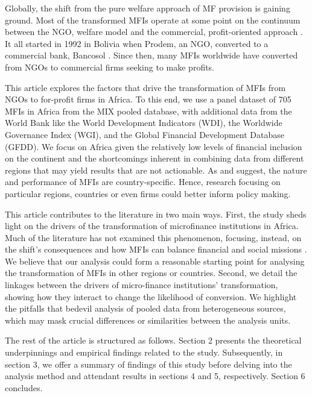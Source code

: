 \documentclass[a4paper,nobind]{templates/ociamthesis}
\begin{document}
Globally, the shift from the pure welfare approach of MF provision is gaining ground. Most of the transformed MFIs operate at some point on the continuum between the NGO, welfare model and the commercial, profit-oriented approach \autocite{armendariz2013subsidy,d2013unsubsidized,hishigsuren2006transformation}. It all started in 1992 in Bolivia when Prodem, an NGO, converted to a commercial bank, Bancosol \autocite{fernando2004micro,creedy2018types}. Since then, many MFIs worldwide have converted from NGOs to commercial firms seeking to make profits.

This article explores the factors that drive the transformation of MFIs from NGOs to for-profit firms in Africa. To this end, we use a panel dataset of 705 MFIs in Africa from the MIX pooled database, with additional data from the World Bank like the World Development Indicators (WDI), the Worldwide Governance Index (WGI), and the Global Financial Development Database (GFDD). We focus on Africa given the relatively low levels of financial inclusion on the continent \autocite{demirguc2018global}and the shortcomings inherent in combining data from different regions that may yield results that are not actionable. As \textcite{d2017ngos} and \textcite{wang2015ownership} suggest, the nature and performance of MFIs are country-specific. Hence, research focusing on particular regions, countries or even firms could better inform policy making.

This article contributes to the literature in two main ways. First, the study sheds light on the drivers of the transformation of microfinance institutions in Africa. Much of the literature has not examined this phenomenon, focusing, instead, on the shift's consequences and how MFIs can balance financial and social missions \autocite{d2013unsubsidized,forkusam2014does,mia2017mission}. We believe that our analysis could form a reasonable starting point for analysing the transformation of MFIs in other regions or countries. Second, we detail the linkages between the drivers of micro-finance institutions' transformation, showing how they interact to change the likelihood of conversion. We highlight the pitfalls that bedevil analysis of pooled data from heterogeneous sources, which may mask crucial differences or similarities between the analysis units.

The rest of the article is structured as follows. Section 2 presents the theoretical underpinnings and empirical findings related to the study. Subsequently, in section 3, we offer a summary of findings of this study before delving into the analysis method and attendant results in sections 4 and 5, respectively. Section 6 concludes.
\end{document}
